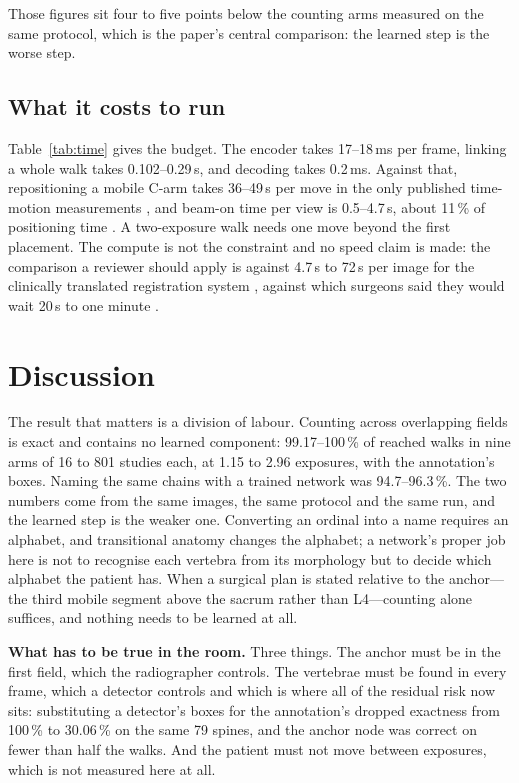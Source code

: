 \documentclass[11pt,letterpaper]{article}
\begin{document}
Those figures sit four to five points below the counting arms measured on the same protocol, which is the
paper's central comparison: the learned step is the worse step.

\subsection*{What it costs to run}
Table~\ref{tab:time} gives the budget. The encoder takes 17--18\,ms per frame, linking a whole walk takes
0.102--0.29\,s, and decoding takes 0.2\,ms. Against that, repositioning a mobile C-arm takes 36--49\,s per
move in the only published time-motion measurements \citep{matthews2007,desilva2018}, and beam-on time per
view is 0.5--4.7\,s, about 11\,\% of positioning time \citep{desilva2018}. A two-exposure walk needs one
move beyond the first placement. The compute is not the constraint and no speed claim is made: the
comparison a reviewer should apply is against 4.7\,s to 72\,s per image for the clinically translated
registration system \citep{levelcheck2012,manbachi2018}, against which surgeons said they would wait 20\,s
to one minute \citep{desilva2016}.

\section*{Discussion}

The result that matters is a division of labour. Counting across overlapping fields is exact and contains no
learned component: 99.17--100\,\% of reached walks in nine arms of 16 to 801 studies each, at 1.15 to 2.96
exposures, with the annotation's boxes. Naming the same chains with a trained network was 94.7--96.3\,\%. The two numbers come
from the same images, the same protocol and the same run, and the learned step is the weaker one. Converting
an ordinal into a name requires an alphabet, and transitional anatomy changes the alphabet; a network's
proper job here is not to recognise each vertebra from its morphology but to decide which alphabet the
patient has. When a surgical plan is stated relative to the anchor---the third mobile segment above the
sacrum rather than L4---counting alone suffices, and nothing needs to be learned at all.

\noindent\textbf{What has to be true in the room.} Three things. The anchor must be in the first field,
which the radiographer controls. The vertebrae must be found in every frame, which a detector controls and
which is where all of the residual risk now sits: substituting a detector's boxes for the annotation's
dropped exactness from 100\,\% to 30.06\,\% on the same 79 spines, and the anchor node was correct on fewer
than half the walks. And the patient must not move between exposures, which is not measured here at all.
\end{document}
